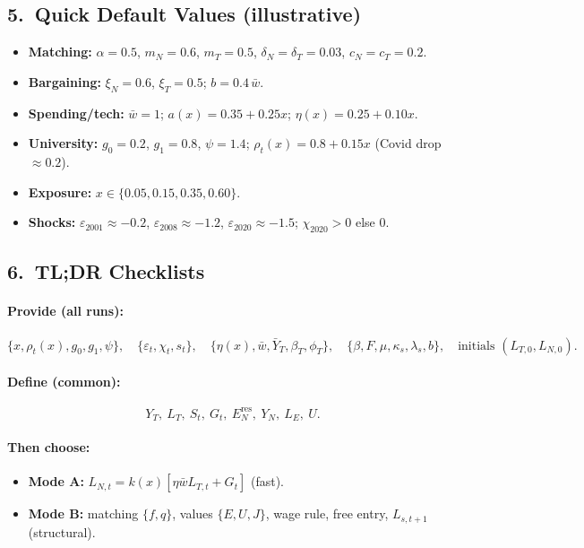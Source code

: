 \subsection*{5.\ Quick Default Values (illustrative)}
\begin{itemize}
	\item \textbf{Matching:} $\alpha=0.5$, $m_N=0.6$, $m_T=0.5$, $\delta_N=\delta_T=0.03$, $c_N=c_T=0.2$.
	\item \textbf{Bargaining:} $\xi_N=0.6$, $\xi_T=0.5$;\; $b=0.4\,\bar w$.
	\item \textbf{Spending/tech:} $\bar w=1$;\; $a(x)=0.35+0.25x$;\; $\eta(x)=0.25+0.10x$.
	\item \textbf{University:} $g_0=0.2$, $g_1=0.8$, $\psi=1.4$;\; $\rho_t(x)=0.8+0.15x$ (Covid drop $\approx 0.2$).
	\item \textbf{Exposure:} $x\in\{0.05,0.15,0.35,0.60\}$.
	\item \textbf{Shocks:} $\varepsilon_{2001}\approx -0.2$, $\varepsilon_{2008}\approx -1.2$, $\varepsilon_{2020}\approx -1.5$;\; $\chi_{2020}>0$ else $0$.
\end{itemize}

\subsection*{6.\ TL;DR Checklists}
\paragraph{Provide (all runs):}
\[
\{x,\rho_t(x),g_0,g_1,\psi\},\quad
\{\varepsilon_t,\chi_t,s_t\},\quad
\{\eta(x),\bar w,\bar Y_T,\beta_T,\phi_T\},\quad
\{\beta,F,\mu,\kappa_s,\lambda_s,b\},\quad
\text{initials }(L_{T,0},L_{N,0}).
\]
\paragraph{Define (common):}
\[
Y_T,\ L_T,\ S_t,\ G_t,\ E^{\mathrm{res}}_N,\ Y_N,\ L_E,\ U.
\]
\paragraph{Then choose:}
\begin{itemize}
	\item \textbf{Mode A:} $L_{N,t}=k(x)[\eta \bar w L_{T,t}+G_t]$ (fast).
	\item \textbf{Mode B:} matching $\{f,q\}$,\; values $\{E,U,J\}$,\; wage rule,\; free entry,\; $L_{s,t+1}$ (structural).
\end{itemize}


